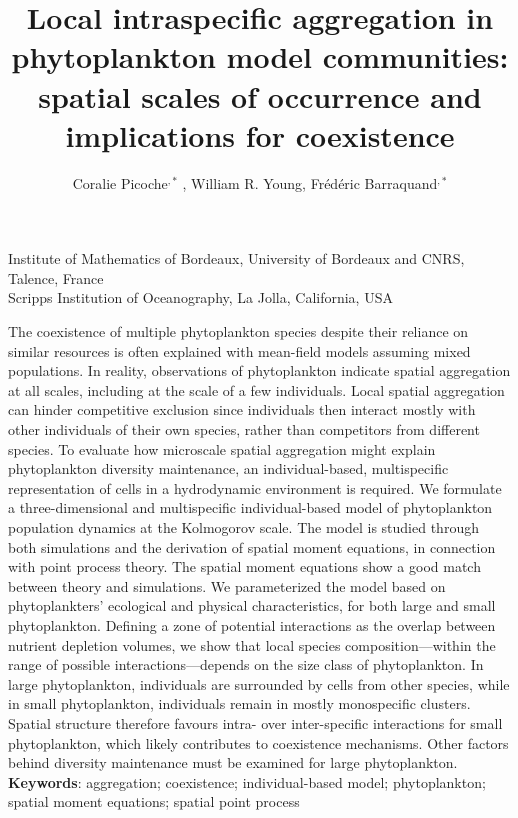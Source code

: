 \documentclass[english]{article}
\date{}
\newcommand{\lyxaddress}[1]{
	\par {\raggedright #1
	\vspace{1.4em}
	\noindent\par}
}
\renewenvironment{abstract}
 {\small
  \begin{center}
  \bfseries \abstractname\vspace{-.5em}\vspace{0pt}
  \end{center}
  \list{}{
    \setlength{\leftmargin}{.5cm}%
    \setlength{\rightmargin}{\leftmargin}%
  }%
  \item\relax}
 {\endlist}
\begin{document}
\title{Local intraspecific aggregation in phytoplankton model communities:
spatial scales of occurrence and implications for coexistence}
\author{Coralie Picoche\textonesuperior$^{,*}$ , William R. Young\texttwosuperior ,
Fr\'e{}d\'e{}ric Barraquand\textonesuperior$^{,*}${}}
\maketitle

\lyxaddress{\noindent \begin{center}
\textonesuperior Institute of Mathematics of Bordeaux, University
of Bordeaux and CNRS, Talence, France\\
\texttwosuperior Scripps Institution of Oceanography, La Jolla, California,
USA
\par\end{center}}

\vspace{-1cm}
\begin{abstract}
The coexistence of multiple phytoplankton species despite their reliance
on similar resources is often explained with mean-field models assuming
mixed populations. In reality, observations of phytoplankton indicate
spatial aggregation at all scales, including at the scale of a few
individuals. Local spatial aggregation can hinder competitive exclusion
since individuals then interact mostly with other individuals of their
own species, rather than competitors from different species. To evaluate
how microscale spatial aggregation might explain phytoplankton diversity
maintenance, an individual-based, multispecific representation of
cells in a hydrodynamic environment is required. We formulate a three-dimensional
and multispecific individual-based model of phytoplankton population
dynamics at the Kolmogorov scale. The model is studied through both
simulations and the derivation of spatial moment equations, in connection
with point process theory. The spatial moment equations show a good
match between theory and simulations. We parameterized the model based
on phytoplankters\textquoteright{} ecological and physical characteristics,
for both large and small phytoplankton. Defining a zone of potential
interactions as the overlap between nutrient depletion volumes, we
show that local species composition---within the range of possible
interactions---depends on the size class of phytoplankton. In large
phytoplankton, individuals are surrounded by cells from other species,
while in small phytoplankton, individuals remain in mostly monospecific
clusters. Spatial structure therefore favours intra- over inter-specific
interactions for small phytoplankton, which likely contributes to
coexistence mechanisms. Other factors behind diversity maintenance
must be examined for large phytoplankton. 
\end{abstract}
\textbf{Keywords}: aggregation; coexistence; individual-based model;
phytoplankton; spatial moment equations; spatial point process 
\end{document}
